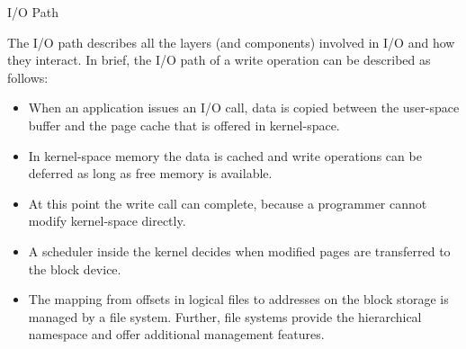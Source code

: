 \documentclass[compress,11pt,xcolor=svgnames,aspectratio=169]{beamer}
\begin{document}
\begin{frame}[t]{I/O Path}

The I/O path describes all the layers (and components) involved in I/O and how they interact.
In brief, the I/O path of a write operation can be described as follows:

    \begin{itemize}

        \item When an application issues an I/O call, data is copied between the user-space buffer and the page cache that is offered in kernel-space.

        \item In kernel-space memory the data is cached and write operations can be deferred as long as free memory is available.

        \item At this point the write call can complete, because a programmer cannot modify kernel-space directly.

        \item A scheduler inside the kernel decides when modified pages are transferred to the block device.

        \item The mapping from offsets in logical files to addresses on the block storage is managed by a file system. Further, file systems provide the hierarchical namespace and offer additional management features.

    \end{itemize}

\nocite{SOPPOAASLK13}

\end{frame}
\end{document}
